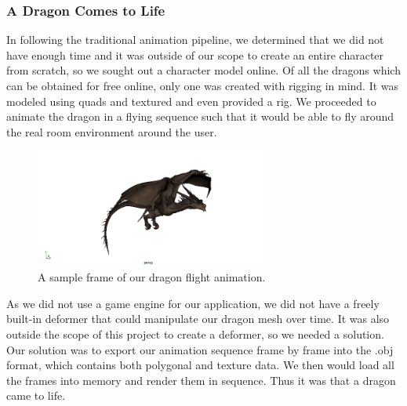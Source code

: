 \subsubsection{A Dragon Comes to Life}
In following the traditional animation pipeline, we determined that we did not have enough time and it was outside of our scope to create an entire character from scratch, so we sought out a character model online. Of all the dragons which can be obtained for free online, only one was created with rigging in mind. It was modeled using quads and textured and even provided a rig\cite{dragon}. We proceeded to animate the dragon in a flying sequence such that it would be able to fly around the real room environment around the user.
\begin{figure}[ht]
	\centering
	\includegraphics[width=3.0in]{images/cycle.0012.png}
	\caption{A sample frame of our dragon flight animation.}
	\label{fig:dragon}
\end{figure}
As we did not use a game engine for our application, we did not have a freely built-in deformer that could manipulate our dragon mesh over time. It was also outside the scope of this project to create a deformer, so we needed a solution. Our solution was to export our animation sequence frame by frame into the .obj format, which contains both polygonal and texture data. We then would load all the frames into memory and render them in sequence. Thus it was that a dragon came to life.
